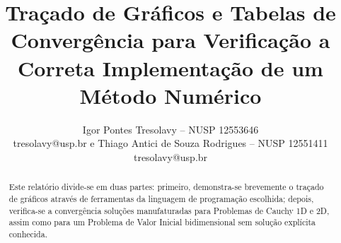 \documentclass[twocolumn,amsmath,amssymb,floatfix]{revtex4}
\begin{document}

\title{Traçado de Gráficos e Tabelas de Convergência para Verificação a Correta Implementação de um Método Numérico}

\author{Igor Pontes Tresolavy -- NUSP 12553646 \\\small tresolavy@usp.br e Thiago Antici de Souza Rodrigues -- NUSP 12551411 \\\small tresolavy@usp.br}

\begin{abstract}
\baselineskip 11pt
Este relatório divide-se em duas partes: primeiro, demonstra-se brevemente o traçado de gráficos através de ferramentas da linguagem de programação escolhida; depois, verifica-se a convergência soluções manufaturadas para Problemas de Cauchy 1D e 2D, assim como para um Problema de Valor Inicial bidimensional sem solução explícita conhecida.
\end{abstract}

\maketitle





\end{document}
